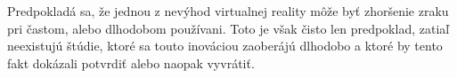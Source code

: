 \par \qquad Predpokladá sa, že jednou z nevýhod virtualnej reality môže byť zhoršenie zraku pri 
častom, alebo dlhodobom používani. Toto je však čisto len predpoklad, zatiaľ neexistujú
štúdie, ktoré sa touto inováciou zaoberájú dlhodobo a ktoré by tento fakt dokázali
potvrdiť alebo naopak vyvrátiť. 
